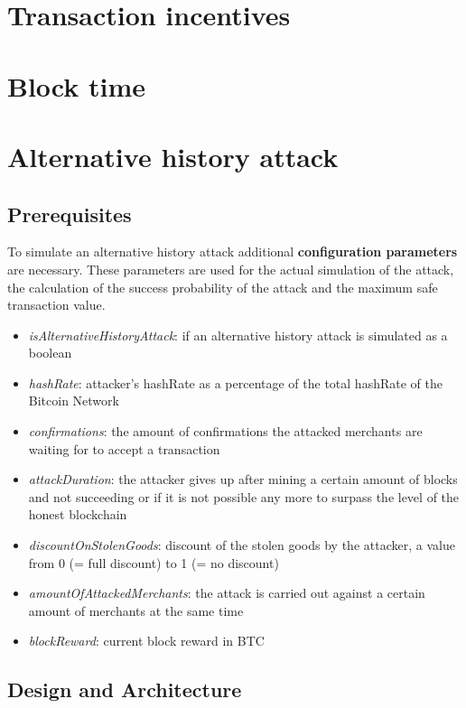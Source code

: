 \section{Transaction incentives}

\section{Block time}

\section{Alternative history attack}

\subsection{Prerequisites}

To simulate an alternative history attack additional \textbf{configuration parameters} are necessary. These parameters are used for the actual simulation of the attack, the calculation of the success probability of the attack and the maximum safe transaction value.

\begin{itemize}
\item \textit{isAlternativeHistoryAttack}: if an alternative history attack is simulated as a boolean
\item \textit{hashRate}: attacker's hashRate as a percentage of the total hashRate of the Bitcoin Network
\item \textit{confirmations}: the amount of confirmations the attacked merchants are waiting for to accept a transaction
\item \textit{attackDuration}: the attacker gives up after mining a certain amount of blocks and not succeeding or if it is not possible any more to surpass the level of the honest blockchain
\item \textit{discountOnStolenGoods}: discount of the stolen goods by the attacker, a value from 0 (= full discount) to 1 (= no discount)
\item \textit{amountOfAttackedMerchants}: the attack is carried out against a certain amount of merchants at the same time
\item \textit{blockReward}: current block reward in BTC
\end{itemize}

\subsection{Design and Architecture}

